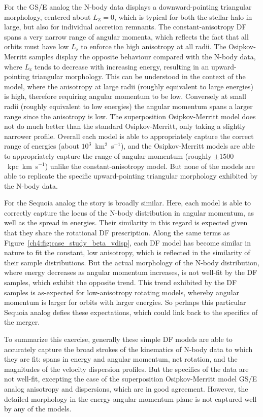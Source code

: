 For the GS/E analog the N-body data displays a downward-pointing triangular morphology, centered about $L_\mathrm{Z}=0$, which is typical for both the stellar halo in large, but also for individual accretion remnants. The constant-anisotropy DF spans a very narrow range of angular momenta, which reflects the fact that all orbits must have low $L_\mathrm{z}$ to enforce the high anisotropy at all radii. The Osipkov-Merritt samples display the opposite behaviour compared with the N-body data, where $L_\mathrm{z}$ tends to decrease with increasing energy, resulting in an upward-pointing triangular morphology. This can be understood in the context of the model, where the anisotropy at large radii (roughly equivalent to large energies) is high, therefore requiring angular momentum to be low. Conversely at small radii (roughly equivalent to low energies) the angular momentum spans a larger range since the anisotropy is low. The superposition Osipkov-Merritt model does not do much better than the standard Osipkov-Merritt, only taking a slightly narrower profile. Overall each model is able to appropriately capture the correct range of energies (about $10^{3}$~km$^{2}$~s$^{-1}$), and the Osipkov-Merritt models are able to appropriately capture the range of angular momentum (roughly $\pm 1500$~kpc~km~s$^{-1}$) unlike the constant-anisotropy model. But none of the models are able to replicate the specific upward-pointing triangular morphology exhibited by the N-body data.

For the Sequoia analog the story is broadly similar. Here, each model is able to correctly capture the locus of the N-body distribution in angular momentum, as well as the spread in energies. Their similarity in this regard is expected given that they share the rotational DF prescription. Along the same terms as Figure~\ref{ch4:fig:case_study_beta_vdisp}, each DF model has become similar in nature to fit the constant, low anisotropy, which is reflected in the similarity of their sample distributions. But the actual morphology of the N-body distribution, where energy decreases as angular momentum increases, is not well-fit by the DF samples, which exhibit the opposite trend. This trend exhibited by the DF samples is as-expected for low-anisotropy rotating models, whereby angular momentum is larger for orbits with larger energies. So perhaps this particular Sequoia analog defies these expectations, which could link back to the specifics of the merger.

To summarize this exercise, generally these simple DF models are able to accurately capture the broad strokes of the kinematics of N-body data to which they are fit: spans in energy and angular momentum, net rotation, and the magnitudes of the velocity dispersion profiles. But the specifics of the data are not well-fit, excepting the case of the superposition Osipkov-Merritt model GS/E analog anisotropy and dispersions, which are in good agreement. However, the detailed morphology in the energy-angular momentum plane is not captured well by any of the models.

